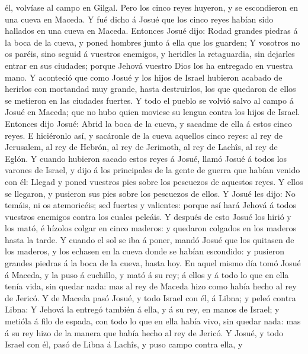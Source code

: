 él, volvíase al campo en Gilgal.  Pero los cinco reyes
huyeron, y se escondieron en una cueva en Maceda.  Y fué
dicho á Josué que los cinco reyes habían sido hallados en una cueva en
Maceda.  Entonces Josué dijo: Rodad grandes piedras á la
boca de la cueva, y poned hombres junto á ella que los guarden;
 Y vosotros no os paréis, sino seguid á vuestros
enemigos, y heridles la retaguardia, sin dejarles entrar en sus
ciudades; porque Jehová vuestro Dios los ha entregado en vuestra mano.
 Y aconteció que como Josué y los hijos de Israel
hubieron acabado de herirlos con mortandad muy grande, hasta
destruirlos, los que quedaron de ellos se metieron en las ciudades
fuertes.  Y todo el pueblo se volvió salvo al campo á
Josué en Maceda; que no hubo quien moviese su lengua contra los hijos de
Israel.  Entonces dijo Josué: Abrid la boca de la cueva,
y sacadme de ella á estos cinco reyes.  E hiciéronlo así,
y sacáronle de la cueva aquellos cinco reyes: al rey de Jerusalem, al
rey de Hebrón, al rey de Jerimoth, al rey de Lachîs, al rey de Eglón.
 Y cuando hubieron sacado estos reyes á Josué, llamó
Josué á todos los varones de Israel, y dijo á los principales de la
gente de guerra que habían venido con él: Llegad y poned vuestros pies
sobre los pescuezos de aquestos reyes. Y ellos se llegaron, y pusieron
sus pies sobre los pescuezos de ellos.  Y Josué les dijo:
No temáis, ni os atemoricéis; sed fuertes y valientes: porque así hará
Jehová á todos vuestros enemigos contra los cuales peleáis.
 Y después de esto Josué los hirió y los mató, é hízolos
colgar en cinco maderos: y quedaron colgados en los maderos hasta la
tarde.  Y cuando el sol se iba á poner, mandó Josué que
los quitasen de los maderos, y los echasen en la cueva donde se habían
escondido: y pusieron grandes piedras á la boca de la cueva, hasta hoy.
 En aquel mismo día tomó Josué á Maceda, y la puso á
cuchillo, y mató á su rey; á ellos y á todo lo que en ella tenía vida,
sin quedar nada: mas al rey de Maceda hizo como había hecho al rey de
Jericó.  Y de Maceda pasó Josué, y todo Israel con él, á
Libna; y peleó contra Libna:  Y Jehová la entregó también
á ella, y á su rey, en manos de Israel; y metióla á filo de espada, con
todo lo que en ella había vivo, sin quedar nada: mas á su rey hizo de la
manera que había hecho al rey de Jericó.  Y Josué, y todo
Israel con él, pasó de Libna á Lachîs, y puso campo contra ella, y
